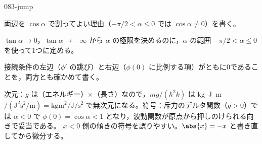 \documentclass[uplatex,dvipdfmx,a4paper,11pt]{jsarticle}
\begin{document}
\begin{kaisetsu}{083-jump}
\begin{ronten}
  \item {} 両辺を $\cos\alpha$ で割ってよい理由（$-\pi/2<\alpha\le 0$ では $\cos\alpha\ne 0$）を書く。
  \item {} $\tan\alpha\to 0$，$\tan\alpha\to-\infty$ から $\alpha$ の極限を決めるのに，$\alpha$ の範囲 $-\pi/2<\alpha\le 0$ を使って1つに定める。
  \item {} 接続条件の左辺（$\phi'$ の跳び）と右辺（$\phi(0)$ に比例する項）がともに0であることを，両方とも確かめて書く。
\end{ronten}
\kenzan 次元：$g$ は（エネルギー）$\times$（長さ）なので，$mg/(\hbar^{2}k)$ は \unit{\kilogram\joule\metre}$/(\unit{\joule\squared\second\squared\per\metre})=\unit{\kilogram\metre\squared\per\joule\per\second\squared}$ で無次元になる。符号：斥力のデルタ関数（$g>0$）では $\alpha<0$ で $\phi(0)=\cos\alpha<1$ となり，波動関数が原点から押しのけられる向きで妥当である。
\tsumazuki $x<0$ 側の傾きの符号を誤りやすい。$\abs{x}=-x$ と書き直してから微分する。
\end{kaisetsu}
\end{document}
